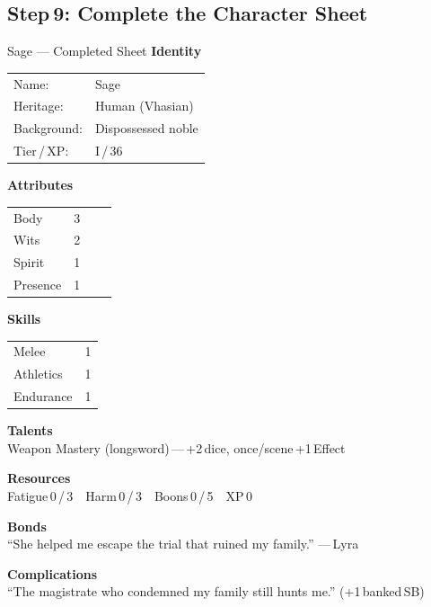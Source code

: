 \documentclass[10pt]{article}
\begin{document}
\subsection*{Step 9: Complete the Character Sheet}
\begin{charbox}{Sage --- Completed Sheet}
    \textbf{Identity}\\
    \begin{tabular}{p{3cm} p{10cm}}
        Name: & Sage \\
        Heritage: & Human (Vhasian) \\
        Background: & Dispossessed noble \\
        Tier / XP: & I / 36 \\
    \end{tabular}
    
    \vspace{0.5em}
    \textbf{Attributes}\\
    \begin{tabular}{p{2cm} c c c}
        Body & 3 & \\
        Wits & 2 & \\
        Spirit & 1 & \\
        Presence & 1 & \\
    \end{tabular}
    
    \vspace{0.5em}
    \textbf{Skills}\\
    \begin{tabular}{p{3cm} c}
        Melee & 1 \\
        Athletics & 1 \\
        Endurance & 1 \\
    \end{tabular}
    
    \vspace{0.5em}
    \textbf{Talents}\\
    Weapon Mastery (longsword) --- +2 dice, once/scene +1 Effect
    
    \vspace{0.5em}
    \textbf{Resources}\\
    Fatigue 0 / 3 Harm 0 / 3 Boons 0 / 5 XP 0
    
    \vspace{0.5em}
    \textbf{Bonds}\\
    ``She helped me escape the trial that ruined my family.'' --- Lyra
    
    \vspace{0.5em}
    \textbf{Complications}\\
    ``The magistrate who condemned my family still hunts me.'' (+1 banked SB)
    

\end{charbox}
\end{document}
